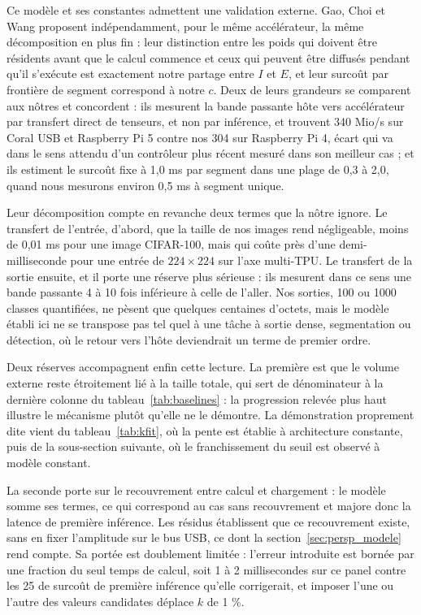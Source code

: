 \documentclass[11pt,a4paper]{report}
\begin{document}
Ce modèle et ses constantes admettent une validation externe. Gao, Choi et Wang \cite{gaoWorkInProgressModeling2025} proposent indépendamment, pour le même accélérateur, la même décomposition en plus fin : leur distinction entre les poids qui doivent être résidents avant que le calcul commence et ceux qui peuvent être diffusés pendant qu'il s'exécute est exactement notre partage entre $I$ et $E$, et leur surcoût par frontière de segment correspond à notre $c$. Deux de leurs grandeurs se comparent aux nôtres et concordent : ils mesurent la bande passante hôte vers accélérateur par transfert direct de tenseurs, et non par inférence, et trouvent 340 Mio/s sur Coral USB et Raspberry Pi 5 contre nos 304 sur Raspberry Pi 4, écart qui va dans le sens attendu d'un contrôleur plus récent mesuré dans son meilleur cas ; et ils estiment le surcoût fixe à 1,0 ms par segment dans une plage de 0,3 à 2,0, quand nous mesurons environ 0,5 ms à segment unique.

Leur décomposition compte en revanche deux termes que la nôtre ignore. Le transfert de l'entrée, d'abord, que la taille de nos images rend négligeable, moins de 0,01 ms pour une image CIFAR-100, mais qui coûte près d'une demi-milliseconde pour une entrée de $224 \times 224$ sur l'axe multi-TPU. Le transfert de la sortie ensuite, et il porte une réserve plus sérieuse : ils mesurent dans ce sens une bande passante 4 à 10 fois inférieure à celle de l'aller. Nos sorties, 100 ou 1000 classes quantifiées, ne pèsent que quelques centaines d'octets, mais le modèle établi ici ne se transpose pas tel quel à une tâche à sortie dense, segmentation ou détection, où le retour vers l'hôte deviendrait un terme de premier ordre.

Deux réserves accompagnent enfin cette lecture. La première est que le volume externe reste étroitement lié à la taille totale, qui sert de dénominateur à la dernière colonne du tableau~\ref{tab:baselines} : la progression relevée plus haut illustre le mécanisme plutôt qu'elle ne le démontre. La démonstration proprement dite vient du tableau~\ref{tab:kfit}, où la pente est établie à architecture constante, puis de la sous-section suivante, où le franchissement du seuil est observé à modèle constant.

La seconde porte sur le recouvrement entre calcul et chargement : le modèle somme ses termes, ce qui correspond au cas sans recouvrement et majore donc la latence de première inférence. Les résidus établissent que ce recouvrement existe, sans en fixer l'amplitude sur le bus USB, ce dont la section~\ref{sec:persp_modele} rend compte. Sa portée est doublement limitée : l'erreur introduite est bornée par une fraction du seul temps de calcul, soit 1 à 2 millisecondes sur ce panel contre les 25 de surcoût de première inférence qu'elle corrigerait, et imposer l'une ou l'autre des valeurs candidates déplace $k$ de 1 \%.
\end{document}
